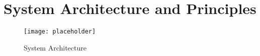 \section{System Architecture and Principles}

\glipsum[1]

\begin{figure}
  \centering
  \texttt{[image: placeholder]}
  \caption{System Architecture}
  \label{fig:system-architecture}
\end{figure}
